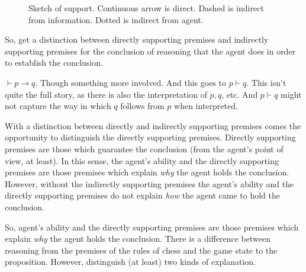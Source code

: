 \documentclass[10pt]{article}
\begin{document}
\begin{figure}[h]
  \centering
\caption{Sketch of support.
  Continuous arrow is direct.
  Dashed is indirect from information.
  Dotted is indirect from agent.}
\label{fig:dynamics}
\end{figure}

So, get a distinction between directly supporting premises and indirectly supporting premises for the conclusion of reasoning that the agent does in order to establish the conclusion.

\begin{note}
  \(\vdash p \rightarrow q\).
  Though something more involved.
  And this goes to \(p \vdash q\).
  This isn't quite the full story, as there is also the interpretation of \(p, q\), etc.
  And \(p \vdash q\) might not capture the way in which \(q\) follows from \(p\) when interpreted.
\end{note}

With a distinction between directly and indirectly supporting premises comes the opportunity to distinguish the directly supporting premises.
Directly supporting premises are those which {\color{red} guarantee} the conclusion (from the agent's point of view, at least).
In this sense, the agent's ability and the directly supporting premises are those premises which explain \emph{why} the agent holds the conclusion.
However, without the indirectly supporting premises the agent's ability and the directly supporting premises do not explain \emph{how} the agent came to hold the conclusion.


So, agent's ability and the directly supporting premises are those premises which explain \emph{why} the agent holds the conclusion.
There is a difference between reasoning from the premises of the rules of chess and the game state to the proposition.
However, distinguish (at least) two kinds of explanation.
\end{document}
